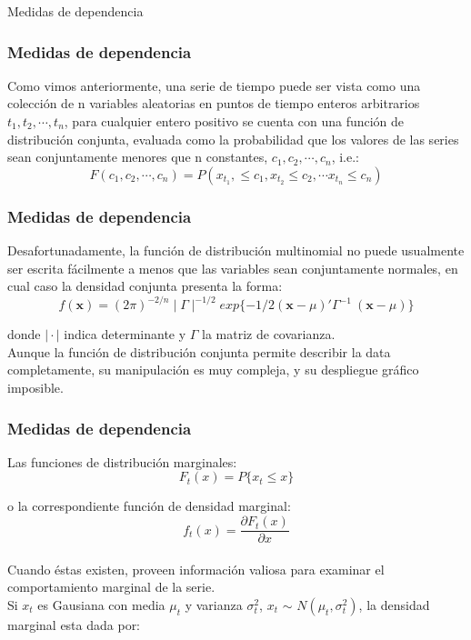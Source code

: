 \documentclass[xcolor=(list of options)]{beamer}
\begin{document}
\begin{section}{Medidas de dependencia}
\begin{frame}
\frametitle{Medidas de dependencia}

Como vimos anteriormente, una serie de tiempo puede ser vista como una colecci\'on de n variables aleatorias en puntos de tiempo enteros arbitrarios $t_1, t_2,\cdots, t_n$, para cualquier entero positivo se cuenta con una funci\'on de distribuci\'on conjunta, evaluada como la probabilidad que los valores de las series sean conjuntamente menores que n constantes, $c_1, c_2,\cdots, c_n$, i.e.:
\begin{equation*}
F(c_1, c_2,\cdots, c_n) =  P(x_{t_1},\le c_1, x_{t_2} 	\le c_2,\cdots x_{t_n} \le c_n)
\end{equation*}
\end{frame}

\begin{frame}
\frametitle{Medidas de dependencia}

Desafortunadamente, la funci\'on de distribuci\'on multinomial no puede usualmente ser escrita f\'acilmente a menos que las variables sean conjuntamente normales, en cual caso la densidad conjunta presenta la forma:
\begin{equation*}
f(\textbf{x}) = (2\pi)^{-2/n}\mid\Gamma\mid^{-1/2} exp \{ -1/2  (\textbf{x} - \mu)' \Gamma^{-1}\ (\textbf{x} - \mu)\}
\end{equation*}

donde $\mid\cdot\mid$ indica determinante y $\Gamma$ la matriz de covarianza.\\
Aunque la funci\'on de distribuci\'on conjunta permite describir la data completamente, su manipulaci\'on es muy compleja, y su despliegue gr\'afico imposible.
\end{frame}

\begin{frame}
\frametitle{Medidas de dependencia}

Las funciones de distribuci\'on marginales:
\begin{equation*}
F_t(x) = P\{x_t \le x\}
\end{equation*}

o la correspondiente funci\'on de densidad marginal:\\
\begin{equation*}
f_t(x) = \frac{\partial F_t(x)}{\partial x} 
\end{equation*}
 \\
Cuando \'estas existen, proveen informaci\'on valiosa para examinar el comportamiento marginal de la serie.
\\
Si $x_t$ es Gausiana con media $\mu_t$ y varianza $\sigma_t^2$, $x_t$ $\sim$ $N(\mu_t,\sigma_t^2)$, la densidad marginal esta dada por:


\end{frame}
\end{section}
\end{document}
